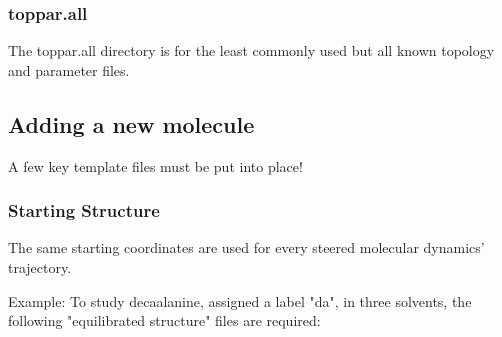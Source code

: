 \documentclass[11pt]{article}
\begin{document}
\subsubsection{toppar.all}
The toppar.all directory is for the least commonly used but all known topology and parameter files.

\subsection{Adding a new molecule}
A few key template files must be put into place!
\subsubsection{Starting Structure}
The same starting coordinates are used for every steered molecular dynamics' trajectory.

Example: To study decaalanine, assigned a label "da", in three solvents, the following "equilibrated structure" files are required:
\end{document}
